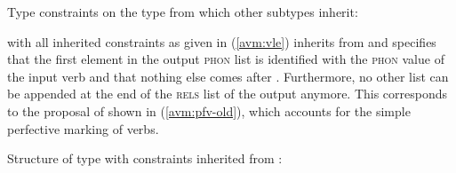 \ea\label{avm:pfv-new}
Type constraints on the type  from which other subtypes inherit:\\
\z

 with all inherited constraints as given in (\ref{avm:vle}) inherits from  and specifies that the first element in the output \textsc{phon} list is identified with the \textsc{phon} value of the input verb
and that nothing else comes after .
Furthermore, no other list can be appended at the end of the \textsc{rels} list of the output anymore.
This corresponds to the proposal of \citet[246]{MuellerLipenkova2013} shown in (\ref{avm:pfv-old}), 
which accounts for the simple perfective marking of verbs.

\ea\label{avm:vle}
Structure of type  with constraints inherited from :\\
\z

